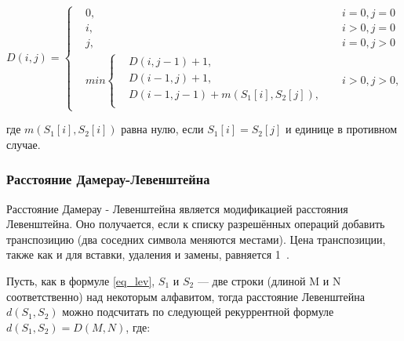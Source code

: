 \documentclass[a4paper,12pt]{article}
\begin{document}
		    \begin{equation}
		     D(i, j) =  \left\{
			\begin{aligned}
				&0, && i = 0, j = 0\\
		    	&i, && i > 0, j = 0\\
		    	&j, && i = 0, j > 0\\
		    	&min \left\{
				\begin{aligned}
					&D(i, j - 1) + 1,\\
		            &D(i - 1, j) + 1, \\
		            &D(i - 1, j - 1) + m(S_{1}[i], S_{2}[j]),\\
		        \end{aligned} \right. &&i > 0, j > 0,
			\end{aligned} \right.
			\label{eq_lev}
			\end{equation}
				    
		    где $m(S_{1}[i], S_{2}[i])$  равна нулю, если $S_{1}[i] = S_{2}[j]$ и 					единице в противном случае. ~\cite{lev_pas} \\
		     		
		    
	  	\subsubsection{Расстояние Дамерау-Левенштейна}
		    Расстояние Дамерау - Левенштейна является модификацией расстояния Левенштейна. Оно получается, если к списку разрешённых операций добавить транспозицию (два соседних символа меняются местами). Цена транспозиции, также как и для вставки, удаления и замены, равняется 1~\cite{dam_lev_habr}.
	
		    
		    Пусть, как в формуле \ref{eq_lev}, $S_{1}$ и $S_{2}$ — две строки (длиной M и N соответственно) над некоторым алфавитом, тогда расстояние Левенштейна $d(S_{1}, S_{2})$ можно подсчитать по следующей рекуррентной формуле $d(S_{1}, S_{2}) = D(M, N)$, где:
		    
\end{document}
